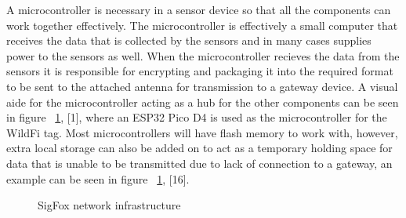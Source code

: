 \documentclass[sigplan,screen,nonacm]{acmart}
\begin{document}
A microcontroller is necessary in a sensor device so that all the components can work together effectively. The 
microcontroller is effectively a small computer that receives the data that is collected by the sensors and in 
many cases supplies power to the sensors as well. When the microcontroller recieves the data from the sensors 
it is responsible for encrypting and packaging it into the required format to be sent to the attached antenna 
for transmission to a gateway device. A visual aide for the microcontroller acting as a hub for the other 
components can be seen in figure ~\ref{fig:WildFi_microcontroller}, [1], where an ESP32 Pico D4 is used as the 
microcontroller for the WildFi tag. Most microcontrollers will have flash memory to work with, however, 
extra local storage can also be added on to act as a temporary holding space for data that is unable to be 
transmitted due to lack of connection to a gateway, an example can be seen in figure ~\ref{fig:WildFi_microcontroller}, [16].
\begin{figure}[htbp]
  \centering
  \caption{SigFox network infrastructure\cite{wild2023internet}}
  \label{fig:WildFi_microcontroller}
\end{figure}
\end{document}
